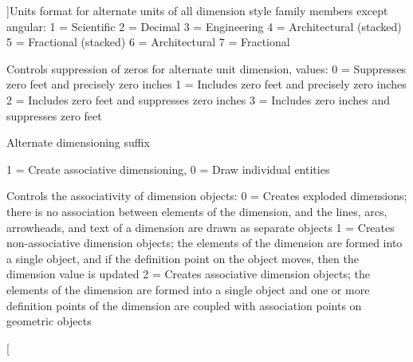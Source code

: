 \begin{Desc}
\begin{description}
{}]Units format for alternate units of all dimension style family members except angular\+: 1 = Scientific 2 = Decimal 3 = Engineering 4 = Architectural (stacked) 5 = Fractional (stacked) 6 = Architectural 7 = Fractional \item[{\em 
D\+I\+M\+A\+L\+TZ\hypertarget{class_c_a_d_header_abd894aab7aa85b4c4634e67fb93d6886a3ce7061f52ab9718cc62c0078ce9d24e}{}\label{class_c_a_d_header_abd894aab7aa85b4c4634e67fb93d6886a3ce7061f52ab9718cc62c0078ce9d24e}
}]Controls suppression of zeros for alternate unit dimension, values\+: 0 = Suppresses zero feet and precisely zero inches 1 = Includes zero feet and precisely zero inches 2 = Includes zero feet and suppresses zero inches 3 = Includes zero inches and suppresses zero feet \item[{\em 
D\+I\+M\+A\+P\+O\+ST\hypertarget{class_c_a_d_header_abd894aab7aa85b4c4634e67fb93d6886ab3af0953d44cd4241efc386e788aa3d7}{}\label{class_c_a_d_header_abd894aab7aa85b4c4634e67fb93d6886ab3af0953d44cd4241efc386e788aa3d7}
}]Alternate dimensioning suffix \item[{\em 
D\+I\+M\+A\+SO\hypertarget{class_c_a_d_header_abd894aab7aa85b4c4634e67fb93d6886ab617c127464445b85c569c2045f16fcd}{}\label{class_c_a_d_header_abd894aab7aa85b4c4634e67fb93d6886ab617c127464445b85c569c2045f16fcd}
}]1 = Create associative dimensioning, 0 = Draw individual entities \item[{\em 
D\+I\+M\+A\+S\+S\+OC\hypertarget{class_c_a_d_header_abd894aab7aa85b4c4634e67fb93d6886a94a37e359554c9f3a888b2c5de3cc580}{}\label{class_c_a_d_header_abd894aab7aa85b4c4634e67fb93d6886a94a37e359554c9f3a888b2c5de3cc580}
}]Controls the associativity of dimension objects\+: 0 = Creates exploded dimensions; there is no association between elements of the dimension, and the lines, arcs, arrowheads, and text of a dimension are drawn as separate objects 1 = Creates non-\/associative dimension objects; the elements of the dimension are formed into a single object, and if the definition point on the object moves, then the dimension value is updated 2 = Creates associative dimension objects; the elements of the dimension are formed into a single object and one or more definition points of the dimension are coupled with association points on geometric objects \item[{\em 
}
\end{description}
\end{Desc}
